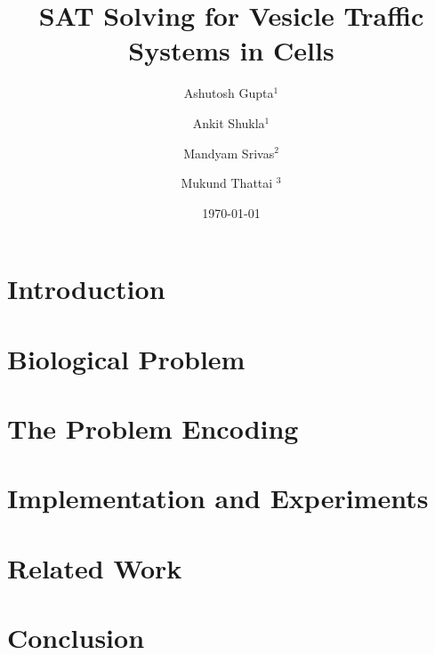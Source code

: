 \documentclass{llncs}
\begin{document}
\title{SAT Solving for Vesicle Traffic Systems in Cells}

\author{Ashutosh Gupta$^1$ \and Ankit Shukla$^1$ \and
  Mandyam Srivas$^2$ \and Mukund Thattai $^3$}


\date{\today}

\maketitle

\begin{abstract}

\end{abstract}

\section{Introduction}
\label{sec:intro}
% 


\section{Biological Problem}
\label{sec:bio}
% 


\section{The Problem Encoding}
\label{sec:encoding}


\section{Implementation and Experiments}
\label{sec:experiments}


\section{Related Work}
\label{sec:related}


\section{Conclusion}
\label{sec:conclusion}





\end{document}
